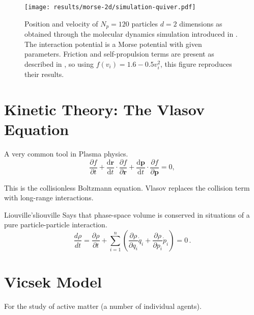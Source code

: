 \hierKoennteIhreWerbungStehen

\begin{figure}[H]
  \centering
  \label{fig:simulation-quiver-illustration}
  \texttt{[image: results/morse-2d/simulation-quiver.pdf]}
  \caption[Quiver plot of 120 particles in 2D interacting through the Morse potential]{Position and velocity of $N_p = 120$ particles $d = 2$ dimensions as obtained through the molecular dynamics simulation introduced in . The interaction potential is a Morse potential with given parameters. Friction and self-propulsion terms are present as described in \cite{2006-self-propelled}, so using $f(v_i) = 1.6 - 0.5 v_i^2$, this figure reproduces their results.}
\end{figure}


\section{Kinetic Theory: The Vlasov Equation}
A very common tool in Plasma physics.
$$\frac{\partial f}{\partial t}+{\frac {\mathrm {d} \mathbf {r} }{\mathrm {d} t}}\cdot {\frac {\partial f}{\partial \mathbf {r} }}+{\frac {\mathrm {d} \mathbf {p} }{\mathrm {d} t}}\cdot {\frac {\partial f}{\partial \mathbf {p} }}=0,$$

This is the collisionless Boltzmann equation.
Vlasov replaces the collision term with long-range interactions.

\begin{theorem}{Liouville's}{liouville}
  Says that phase-space volume is conserved in situations of a pure particle-particle interaction.
  $$\frac{d\rho}{dt}=
    \frac{\partial\rho}{\partial t}
    +\sum_{i=1}^n\left(\frac{\partial\rho}{\partial q_i}\dot{q}_i
    +\frac{\partial\rho}{\partial p_i}\dot{p}_i\right)=0\,.$$
\end{theorem}

\section{Vicsek Model}
For the study of active matter (a number of individual agents).
\hierKoennteIhreWerbungStehen

